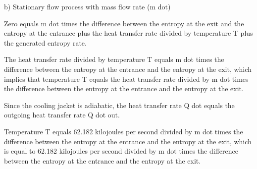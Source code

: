 b) Stationary flow process with mass flow rate (m dot)

Zero equals m dot times the difference between the entropy at the exit and the entropy at the entrance plus the heat transfer rate divided by temperature T plus the generated entropy rate.

The heat transfer rate divided by temperature T equals m dot times the difference between the entropy at the entrance and the entropy at the exit, which implies that temperature T equals the heat transfer rate divided by m dot times the difference between the entropy at the entrance and the entropy at the exit.

Since the cooling jacket is adiabatic, the heat transfer rate Q dot equals the outgoing heat transfer rate Q dot out.

Temperature T equals 62.182 kilojoules per second divided by m dot times the difference between the entropy at the entrance and the entropy at the exit, which is equal to 62.182 kilojoules per second divided by m dot times the difference between the entropy at the entrance and the entropy at the exit.